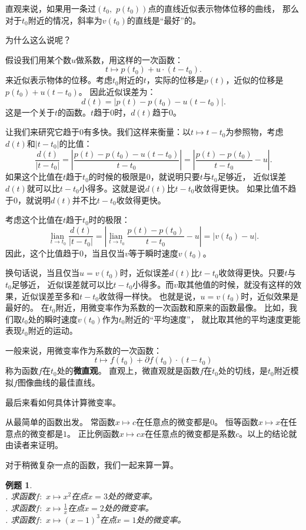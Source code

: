 \documentclass[12pt,UTF8]{ctexbook}
\newcommand{\lian}[1]{
    \underset{#1}{\operatorname{lian}\,}
}
\newtheorem{et}{例题}[section]
\begin{document}
直观来说，如果用一条过$(t_0, \,\,p(t_0))$点的直线近似表示物体位移的曲线，
那么对于$t_0$附近的情况，斜率为$v(t_0)$的直线是“最好”的。

为什么这么说呢？

假设我们用某个数$u$做系数，用这样的一次函数：
$$ t \mapsto p(t_0) + u\cdot (t - t_0).$$
来近似表示物体的位移。考虑$t_0$附近的$t$，实际的位移是$p(t)$，近似的位移是$p(t_0) + u(t - t_0)$。
因此近似误差为：
$$ d(t) = \left|p(t) - p(t_0) - u(t - t_0)\right|. $$
这是一个关于$t$的函数。$t$趋于$0$时，$d(t)$趋于$0$。

让我们来研究它趋于$0$有多快。我们这样来衡量：以$t\mapsto t - t_0$为参照物，考虑$d(t)$和$|t - t_0|$的比值：
$$ \frac{d(t)}{|t - t_0|} = \left|\frac{p(t) - p(t_0) - u(t - t_0)}{t -  t_0}\right| =  \left|\frac{p(t) - p(t_0)}{t -  t_0} - u\right|. $$
如果这个比值在$t$趋于$t_0$的时候的极限是$0$，就说明只要$t$与$t_0$足够近，
近似误差$d(t)$就可以比$t-t_0$小得多。这就是说$d(t)$比$t-t_0$收敛得更快。
如果比值不趋于$0$，就说明$d(t)$并不比$t-t_0$收敛得更快。

考虑这个比值在$t$趋于$t_0$时的极限：
$$ \lian{t\to t_0} \frac{d(t)}{|t - t_0|} = \left|\lian{t\to t_0} \frac{p(t) - p(t_0)}{t -  t_0} - u\right| = |v(t_0) - u|. $$
因此，这个比值趋于$0$，当且仅当$v$等于瞬时速度$v(t_0)$。

换句话说，当且仅当$u = v(t_0)$时，近似误差$d(t)$比$t-t_0$收敛得更快。只要$t$与$t_0$足够近，
近似误差就可以比$t-t_0$小得多。而$v$取其他值的时候，就没有这样的效果，近似误差至多和$t-t_0$收敛得一样快。
也就是说，$u = v(t_0)$时，近似效果是最好的。
在$t_0$附近，用微变率作为系数的一次函数和原来的函数最像。
比如，我们取$t_0$处的瞬时速度$v(t_0)$作为$t_0$附近的“平均速度”，
就比取其他的平均速度更能表现$t_0$附近的运动。

一般来说，用微变率作为系数的一次函数：
$$ t \mapsto f(t_0) + \partial f(t_0) \cdot(t - t_0)$$
称为函数$f$在$t_0$处的\textbf{微直观}。
直观上，微直观就是函数$f$在$t_0$处的切线，是$t_0$附近模拟$f$图像曲线的最佳直线。

最后来看如何具体计算微变率。

从最简单的函数出发。
常函数$x \mapsto c$在任意点的微变都是$0$。
恒等函数$x\mapsto x$在任意点的微变都是$1$。
正比例函数$x \mapsto c x$在任意点的微变都是系数$c$。以上的结论就由读者来证明。

对于稍微复杂一点的函数，我们一起来算一算。

\begin{et}
    \mbox{} \\
    . 求函数$f: \,\, x \mapsto x^2$在点$x = 3$处的微变率。\\
    . 求函数$f: \,\, x \mapsto \frac{1}{x}$在点$x = 2$处的微变率。\\
    . 求函数$f: \,\, x \mapsto (x - 1)^3$在点$x = 1$处的微变率。
\end{et}
\end{document}
